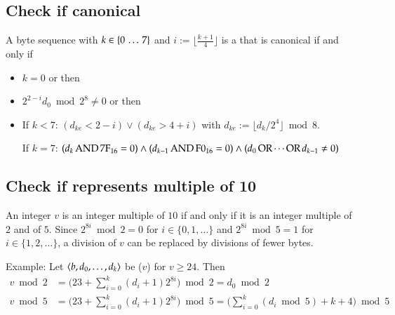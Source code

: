 \subsection{Check if canonical \DborBinaryRationalValue}
\label{sec:implementation:BinaryRationalValue:canonical}

A byte sequence  with
$k \in \{0 \,\ldots\, 7\}$ and $i := \lfloor \frac{k + 1}{4} \rfloor$
is a \DborBinaryRationalValue{} that is canonical if and only if
\begin{itemize}
    \item
    $k = 0$ or then

    \item
    $2^{2 - i} d_0 \bmod 2^8 \ne 0$ or then

    \item
    If $k < 7$:
    $(d_{ke} < 2 - i) \vee (d_{ke} > 4 + i)$
    with $d_{ke} := \lfloor d_k / 2^4 \rfloor \bmod 8$.

    If $k = 7$:
    $(d_k \operatorname{AND} \mathrm{7F}_{16} = 0) \wedge (d_{k - 1} \operatorname{AND} \mathrm{F0}_{16} = 0)
    \wedge (d_0 \operatorname{OR} \cdots \operatorname{OR} d_{k - 1} \ne 0)$
\end{itemize}


\subsection{Check if \DborIntegerValue{} represents multiple of 10}
\label{sec:implementation:IntegerValue:mod10}

An integer $v$ is an integer multiple of $10$ if and only if it is an integer multiple
of $2$ and of $5$.
Since $2^{8i} \bmod 2 = 0$ for $i \in \{0, 1, \ldots\}$
and $2^{8i} \bmod 5 = 1$ for $i \in \{1, 2, \ldots\}$,
a division of $v$ can be replaced by divisions of fewer bytes.

Example:
Let $\langle  b, d_0, \ldots, d_k \rangle$ be \DborIntegerValue($v$) for $v \ge 24$.
Then
\begin{align*}
    v \bmod 2
        & = \big(23 + \sum_{i = 0}^k (d_i + 1) 2^{8 i}\big) \bmod 2
        = d_0 \bmod 2 \\
    v \bmod 5
        & = \big(23 + \sum_{i = 0}^k (d_i + 1) 2^{8 i}\big) \bmod 5
        = \big(\sum_{i = 0}^k (d_i \bmod 5) + k + 4\big) \bmod 5
\end{align*}
